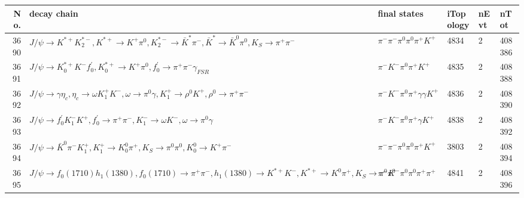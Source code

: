 \begin{table}[htbp] 
\begin{center}
\begin{small}
\begin{tabular}{rlllll}\hline\hline
 No. & decay chain & final states &  iTopology & nEvt & nTot \\\hline
3690&$J/\psi       \rightarrow K^{*+}         K_2^{*-}       , K^{*+}          \rightarrow K^{+}          \pi^{0}        , K_2^{*-}        \rightarrow \bar{K}^{*}   \pi^{-}        , \bar{K}^{*}    \rightarrow \bar{K}^{0}   \pi^{0}        , K_{S}           \rightarrow \pi^{+}        \pi^{-}        $&$\pi^{-}        \pi^{-}        \pi^{0}        \pi^{0}        \pi^{+}        K^{+}          $& 4834&    2&408386\\
3691&$J/\psi       \rightarrow K_{0}^{*+}     K^{-}          f^{'}_{0}     , K_{0}^{*+}      \rightarrow K^{+}          \pi^{0}        , f^{'}_{0}      \rightarrow \pi^{+}        \pi^{-}        \gamma_{FSR} $&$\pi^{-}        K^{-}          \pi^{0}        \pi^{+}        K^{+}          $& 4835&    2&408388\\
3692&$J/\psi       \rightarrow \gamma       \eta_{c}    , \eta_{c}     \rightarrow \omega         K_1^{+}        K^{-}          , \omega          \rightarrow \pi^{0}        \gamma       , K_1^{+}         \rightarrow \rho^{0}      K^{+}          , \rho^{0}       \rightarrow \pi^{+}        \pi^{-}        $&$\pi^{-}        K^{-}          \pi^{0}        \pi^{+}        \gamma       \gamma       K^{+}          $& 4836&    2&408390\\
3693&$J/\psi       \rightarrow f^{'}_{0}     K_{1}^{-}      K^{+}          , f^{'}_{0}      \rightarrow \pi^{+}        \pi^{-}        , K_{1}^{-}       \rightarrow \omega         K^{-}          , \omega          \rightarrow \pi^{0}        \gamma       $&$\pi^{-}        K^{-}          \pi^{0}        \pi^{+}        \gamma       K^{+}          $& 4838&    2&408392\\
3694&$J/\psi       \rightarrow \bar{K}^{0}   \pi^{-}        K_1^{+}        , K_1^{+}         \rightarrow K_0^{0}        \pi^{+}        , K_{S}           \rightarrow \pi^{0}        \pi^{0}        , K_0^{0}         \rightarrow K^{+}          \pi^{-}        $&$\pi^{-}        \pi^{-}        \pi^{0}        \pi^{0}        \pi^{+}        K^{+}          $& 3803&    2&408394\\
3695&$J/\psi       \rightarrow f_{0}(1710)    h_{1}(1380)    , f_{0}(1710)     \rightarrow \pi^{+}        \pi^{-}        , h_{1}(1380)     \rightarrow K^{*+}         K^{-}          , K^{*+}          \rightarrow K^{0}          \pi^{+}        , K_{S}           \rightarrow \pi^{0}        \pi^{0}        $&$\pi^{-}        K^{-}          \pi^{0}        \pi^{0}        \pi^{+}        \pi^{+}        $& 4841&    2&408396\\

\end{tabular}
\end{small}
\end{center}
\end{table}

